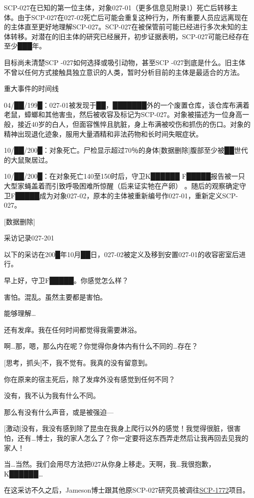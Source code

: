 SCP-027在已知的第一位主体，对象027-01（更多信息见附录1）死亡后转移主体。由于SCP-027在027-02死亡后可能会重复这种行为，所有重要人员应远离现在的主体直至更好地理解SCP-027。SCP-027在被保管前可能已经进行多次未知的主体转移。对潜在的旧主体的研究已经展开，初步证据表明，SCP-027可能已经存在至少███年。

目标尚未清楚SCP -027如何选择或吸引动物，甚至SCP -027到底是什么。旧主体不曾以任何方式接触具独立意识的人类，暂时分析目前的主体是最适合的方法。

\hr

重大事件的时间线

04\slash ██\slash 199█：027-01被发现于██，███████外的一个废置仓库，该仓库布满着老鼠，蟑螂和其他害虫，然后被收容及标记为SCP-027。对象被描述为一位身高一般，接近40岁的白人，但面容憔悴且肮脏，身上布满被咬伤和抓伤的伤口。对象的精神出现退化迹象，服用大量酒精和非法药物和长时间失眠症状。

10\slash ██\slash 200█：对象死亡。尸检显示超过70％的身体[数据删除]腹部至少被██世代的大鼠聚居过。

10\slash ██\slash 200█：在对象死亡140至150时后，守卫K██████ F█████报告被一只大型家蝇盖着而引致呼吸困难所惊醒（后来证实牠在产卵） 。随后的观察确定守卫F█████成为对象027-02，原本的主体被重新编号作027-01，重新定义SCP-027。

[数据删除]

\hr

采访记录027-201

以下的采访在200█年10月██日，027-02被定义及移到安置027-01的收容密室后进行。

\begin{scpbox}

早上好，守卫F█████。你感觉怎么样？

害怕。混乱。虽然主要都是害怕。

能够理解…

还有发痒。我在任何时间都觉得我需要淋浴。

啊…那，嗯，那么内在呢？你觉得你身体内有什么不同的…存在？

[思考，抓头]不，我不觉有。我真的没有留意到。

 你在原来的宿主死后，除了发痒外没有感觉到任何不同？

没有，我不认为我有什么不同。

那么有没有什么声音，或是被强迫—

[激动]没有，我没有感到除了昆虫在我身上爬行以外的感觉！我觉得很脏，很害怕，还有…博士，我的家人怎么了？你一定要将这东西弄走然后让我再回去见我的家人！

当…当然。我们会用尽方法把027从你身上移走。天啊，我…我很抱歉，K██████…

\end{scpbox}

在这采访不久之后，Jameson博士跟其他原SCP-027研究员被调往\hyperref[chap:SCP-1772]{SCP-1772}项目。

\hr
